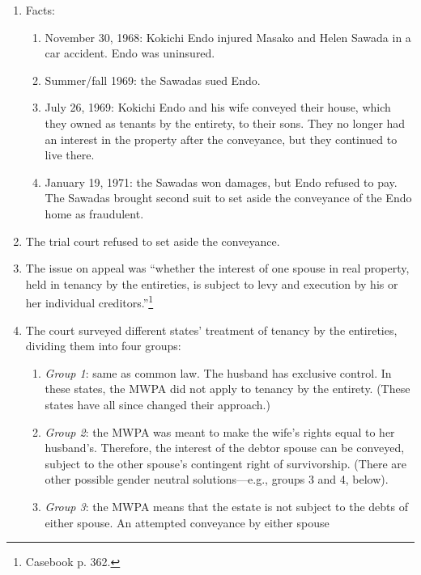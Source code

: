 
\begin{enumerate}
    \item Facts:
    \begin{enumerate}
        \item November 30, 1968: Kokichi Endo injured Masako and Helen Sawada 
        in a car accident. Endo was uninsured.
        \item Summer/fall 1969: the Sawadas sued Endo.
        \item July 26, 1969: Kokichi Endo and his wife conveyed their house, 
        which they owned as tenants by the entirety, to their sons. They no 
        longer had an interest in the property after the conveyance, but they 
        continued to live there.
        \item January 19, 1971: the Sawadas won damages, but Endo refused to 
        pay. The Sawadas brought second suit to set aside the conveyance of 
        the Endo home as fraudulent.
    \end{enumerate}
    \item The trial court refused to set aside the conveyance.
    \item The issue on appeal was ``whether the interest of one spouse in real 
    property, held in tenancy by the entireties, is subject to levy and 
    execution by his or her individual creditors.''\footnote{Casebook p. 362.}
    \item The court surveyed different states' treatment of tenancy by the 
    entireties, dividing them into four groups:
    \begin{enumerate}
        \item \emph{Group 1}: same as common law. The husband has exclusive 
        control. In these states, the MWPA did not apply to tenancy by the 
        entirety. (These states have all since changed their approach.)
        \item \emph{Group 2}: the MWPA was meant to make the wife's rights 
        equal to her husband's. Therefore, the interest of the debtor spouse 
        can be conveyed, subject to the other spouse's contingent right of 
        survivorship. (There are other possible gender neutral 
        solutions---e.g., groups 3 and 4, below).
        \item \emph{Group 3}: the MWPA means that the estate is not subject to 
        the debts of either spouse. An attempted conveyance by either spouse 

\end{enumerate}
\end{enumerate}
